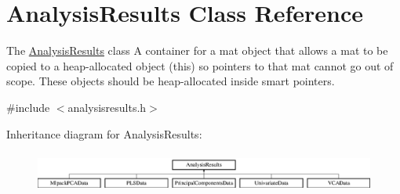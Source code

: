 \hypertarget{class_analysis_results}{}\section{Analysis\+Results Class Reference}
\label{class_analysis_results}


The \hyperlink{class_analysis_results}{Analysis\+Results} class A container for a mat object that allows a mat to be copied to a heap-\/allocated object (this) so pointers to that mat cannot go out of scope. These objects should be heap-\/allocated inside smart pointers.  




{\ttfamily \#include $<$analysisresults.\+h$>$}

Inheritance diagram for Analysis\+Results\+:\begin{figure}[H]
\begin{center}
\leavevmode
\includegraphics[height=1.357576cm]{class_analysis_results}
\end{center}
\end{figure}
